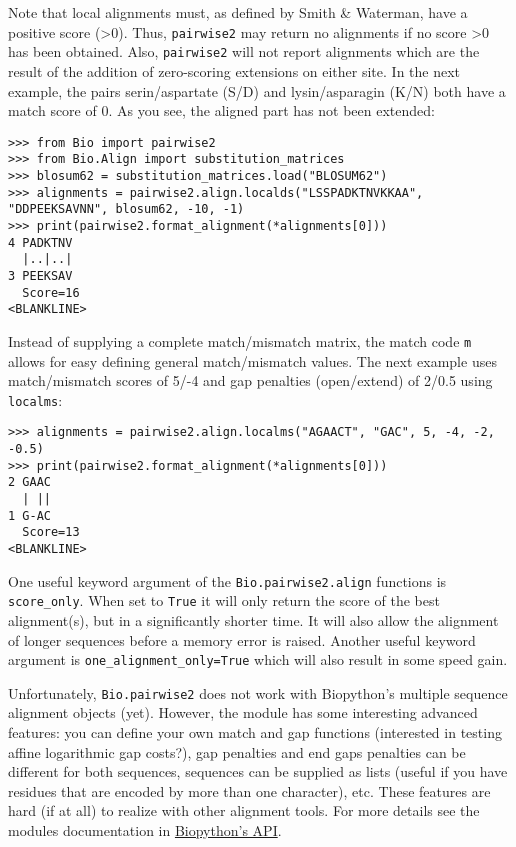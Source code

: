 Note that local alignments must, as defined by Smith \& Waterman, have a 
positive score (\textgreater 0). Thus, \verb|pairwise2| may return no
alignments if no score \textgreater 0 has been obtained. Also, \verb|pairwise2|
will not report alignments which are the result of the addition of zero-scoring
extensions on either site. In the next example, the pairs serin/aspartate (S/D)
and lysin/asparagin (K/N) both have a match score of 0. As you see, the aligned
part has not been extended:

\begin{verbatim}
>>> from Bio import pairwise2
>>> from Bio.Align import substitution_matrices
>>> blosum62 = substitution_matrices.load("BLOSUM62")
>>> alignments = pairwise2.align.localds("LSSPADKTNVKKAA", "DDPEEKSAVNN", blosum62, -10, -1)
>>> print(pairwise2.format_alignment(*alignments[0]))
4 PADKTNV
  |..|..|
3 PEEKSAV
  Score=16
<BLANKLINE>
\end{verbatim}

Instead of supplying a complete match/mismatch matrix, the match code
\texttt{m} allows for easy defining general match/mismatch values. The next
example uses match/mismatch scores of 5/-4 and gap penalties (open/extend)
of 2/0.5 using \verb|localms|:

\begin{verbatim}
>>> alignments = pairwise2.align.localms("AGAACT", "GAC", 5, -4, -2, -0.5)
>>> print(pairwise2.format_alignment(*alignments[0]))
2 GAAC
  | ||
1 G-AC
  Score=13
<BLANKLINE>
\end{verbatim}

One useful keyword argument of the \verb|Bio.pairwise2.align| functions is
\texttt{score\_only}. When set to \texttt{True} it will only return the score
of the best alignment(s), but in a significantly shorter time. It will also
allow the alignment of longer sequences before a memory error is raised.
Another useful keyword argument is \texttt{one\_alignment\_only=True} which
will also result in some speed gain.

Unfortunately, \verb|Bio.pairwise2| does not work with Biopython's multiple
sequence alignment objects (yet).
However, the module has some interesting advanced features: you can
define your own match and gap functions (interested in testing affine
logarithmic gap costs?), gap penalties and end gaps penalties can be different
for both sequences, sequences can be supplied as lists (useful if you have
residues that are encoded by more than one character), etc. These features
are hard (if at all) to realize with other alignment tools. For more details
see the modules documentation in
\href{http://biopython.org/docs/\bpversion/api/Bio.pairwise2.html}{Biopython's API}.

